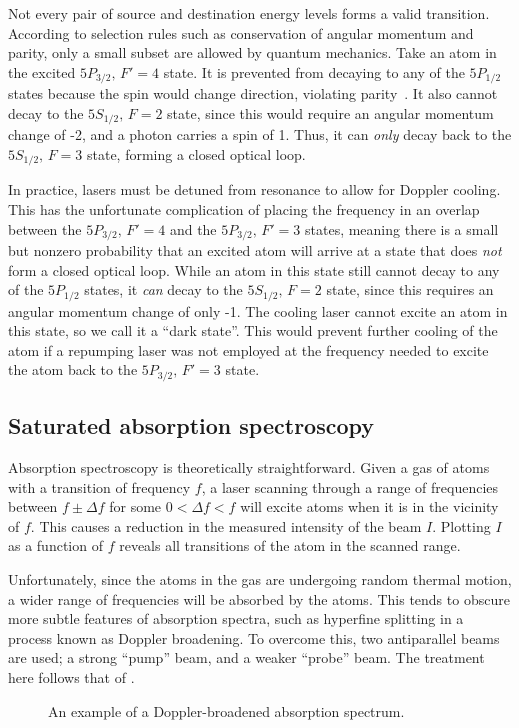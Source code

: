 \documentclass[11pt,twoside,a4paper]{article}
\begin{document}
Not every pair of source and destination energy levels forms a valid transition. According to selection rules such as conservation of angular momentum and parity, only a small subset are allowed by quantum mechanics. Take an atom in the excited \(5P_{3/2},\,F'=4\) state.
It is prevented from decaying to any of the \(5P_{1/2}\) states because the spin would change direction, violating parity~\cite{harandbert}. It also cannot decay to the \(5S_{1/2},\,F=2\) state, since this would require an angular momentum change of -2, and a photon carries
a spin of 1. Thus, it can \textit{only} decay back to the \(5S_{1/2},\,F=3\) state, forming a closed optical loop.

In practice, lasers must be detuned from resonance to allow for Doppler cooling. This has the unfortunate complication of placing the frequency in an overlap between the \(5P_{3/2},\,F'=4\) and the \(5P_{3/2},\,F'=3\) states, meaning there is a small but nonzero probability that an
excited atom will arrive at a state that does \textit{not} form a closed optical loop. While an atom in this state still cannot decay to any of the \(5P_{1/2}\) states, it \textit{can} decay to the \(5S_{1/2},\,F=2\) state, since this requires an angular momentum change of only -1.
The cooling laser cannot excite an atom in this state, so we call it a ``dark state''. This would prevent further cooling of the atom if a repumping laser was not employed at the frequency needed to excite the atom back to the \(5P_{3/2},\,F'=3\) state.
\subsection{Saturated absorption spectroscopy}
Absorption spectroscopy is theoretically straightforward. Given a gas of atoms with a transition of frequency \(f\), a laser scanning through a range of frequencies between \(f\pm\Delta f\) for some \(0<\Delta f<f\) will excite atoms when it is in the vicinity of \(f\). This causes a
reduction in the measured intensity of the beam \(I\). Plotting \(I\) as a function of \(f\) reveals all transitions of the atom in the scanned range.

Unfortunately, since the atoms in the gas are undergoing random thermal motion, a wider range of frequencies will be absorbed by the atoms. This tends to obscure more subtle features of absorption spectra, such as hyperfine splitting in a process known as Doppler broadening. To overcome this, two antiparallel beams are used; a strong ``pump''
beam, and a weaker ``probe'' beam. The treatment here follows that of \cite{satspec}.
\begin{figure}[h]
    \centering
    \caption{An example of a Doppler-broadened absorption spectrum.}
\end{figure}
\end{document}
